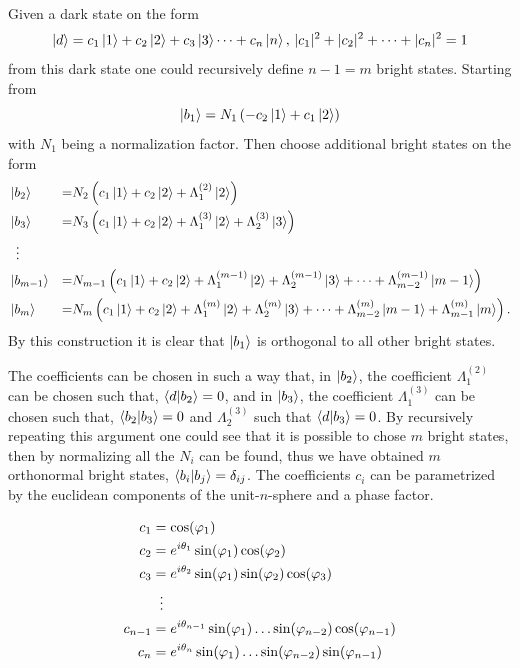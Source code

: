 Given a dark state on the form 
\begin{equation}
\ket{d} = c_1\ket{1} + c_2\ket{2} + c_3\ket{3} \dots + c_{n}\ket{n},\, |c_1|^2 + |c_2|^2 + \dots + |c_{n}|^2 = 1
\end{equation}
from this dark state one could recursively define $n-1 = m$ bright states.
Starting from
\begin{equation}
\ket{b_1} = N_1\left(-c_2\ket{1} + c_1\ket{2}\right)
\end{equation}
with $N_1$ being a normalization factor. Then choose additional bright states on the form
\begin{equation}
\begin{aligned}
&\ket{b_2} &=& N_2 \left(c_1\ket{1} + c_2\ket{2} + \Lambda_{1}^{(2)}\ket{2}  \right)
\\
&\ket{b_3} &=&  N_3 \left(c_1\ket{1} + c_2\ket{2} + \Lambda_{1}^{(3)}\ket{2} + \Lambda_{2}^{(3)}\ket{3} \right)
\\
&\;\;\vdots
\\
&\ket{b_{m-1}} &=& N_{m-1} \left( c_1\ket{1} + c_2\ket{2} + \Lambda_{1}^{(m-1)}\ket{2} + \Lambda_{2}^{(m-1)}\ket{3} + \dots + \Lambda_{m-2}^{(m-1)}\ket{m-1} \right)
\\
&\ket{b_{m}} &=& N_m \left( c_1\ket{1} + c_2\ket{2} + \Lambda_{1}^{(m)}\ket{2} + \Lambda_{2}^{(m)}\ket{3} + \dots + \Lambda_{m-2}^{(m)}\ket{m-1} + \Lambda_{m-1}^{(m)}\ket{m} \right).
\end{aligned}
\end{equation}
By this construction it is clear that $\ket{b_1}$ is orthogonal to all other bright states.

The coefficients can be chosen in such a way that, in $\ket{b_2}$, the coefficient $\Lambda_1^{(2)}$ can be chosen such that, $\bra{d}\ket{b_2} = 0$, and in $\ket{b_3}$, the coefficient $\Lambda_1^{(3)}$ can be chosen such that, $\bra{b_2}\ket{b_3} = 0$ and $\Lambda_2^{(3)}$ such that $\bra{d}\ket{b_3} = 0$. By recursively repeating this argument one could see that it is possible to chose $m$ bright states, then by normalizing all the $N_i$ can be found, thus we have obtained $m$ orthonormal bright states, $\bra{b_i}\ket{b_j} = \delta_{ij}$.
The coefficients $c_i$ can be parametrized by the euclidean components of the unit-$n$-sphere and a phase factor.

\begin{equation}
\begin{aligned}
c_1 &= \cos(\varphi_1)
\\ 
c_2 &= e^{i\theta_1}\sin(\varphi_1)\cos(\varphi_2)
\\ 
c_3 &= e^{i\theta_2}\sin(\varphi_1)\sin(\varphi_2)\cos(\varphi_3)
\\
&\hspace{2mm}\vdots
\\
c_{n-1} &= e^{i\theta_{n-1}}\sin(\varphi_1)\dots\sin(\varphi_{n-2})\cos(\varphi_{n-1})
\\
c_{n} &= e^{i\theta_{n}}\sin(\varphi_1)\dots\sin(\varphi_{n-2})\sin(\varphi_{n-1})
\end{aligned}
\end{equation}

